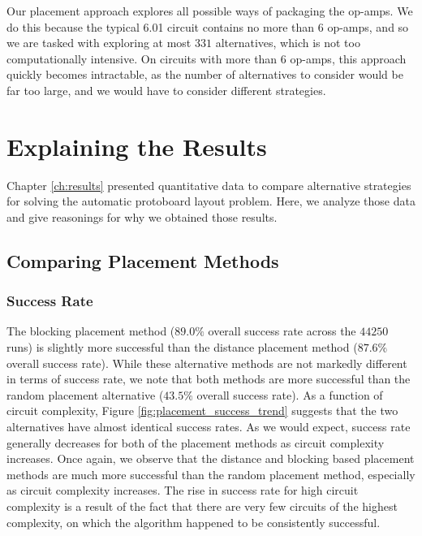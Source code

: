 Our placement approach explores all possible ways
of packaging the op-amps. We do this because the typical 6.01 circuit contains
no more than $6$ op-amps, and so we are tasked with exploring at most $331$
alternatives, which is not too computationally intensive.
On circuits with more than $6$ op-amps, this approach quickly becomes
intractable, as the number of alternatives to consider would be
far too large, and we would have to consider different strategies.

\section{Explaining the Results}

Chapter \ref{ch:results} presented quantitative data to compare alternative
strategies for solving the automatic protoboard layout problem. Here, we
analyze those data and give reasonings for why we obtained those results.

\subsection{Comparing Placement Methods}

\subsubsection{Success Rate}
The blocking placement method ($89.0\%$ overall success rate across the $44250$
runs)
is slightly more successful than the distance placement method ($87.6\%$ overall
success rate). While these alternative methods are not markedly different
in terms of success rate, we note that both methods are
more successful than the random placement alternative ($43.5\%$ overall success
rate).
As a function of circuit
complexity, Figure
\ref{fig:placement_success_trend} suggests that the two alternatives have almost
identical success rates. As we would expect, success rate generally decreases
for both of the placement methods as circuit complexity increases.
Once again, we observe that the distance and blocking based placement methods
are much more successful than the random placement method, especially as
circuit complexity increases.
The rise in success rate for high circuit complexity is a result of the fact
that there are very few circuits of the highest complexity, on which the
algorithm happened to be consistently successful.

